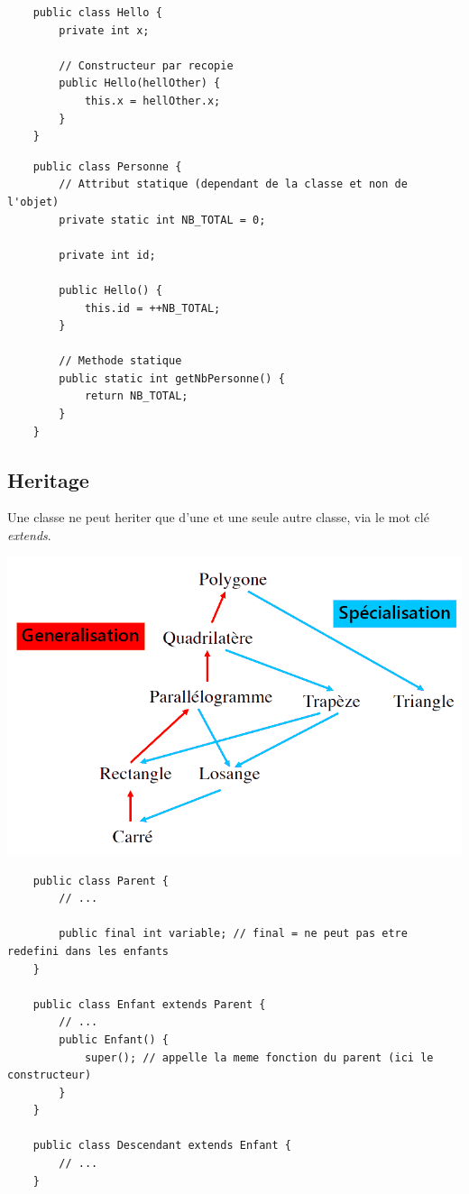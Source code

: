 \documentclass[a4paper, 12pt, french]{article}
\begin{document}
	\begin{lstlisting}
	public class Hello {
		private int x;

		// Constructeur par recopie
		public Hello(hellOther) {
			this.x = hellOther.x;
		}
	}
	\end{lstlisting}

	\begin{lstlisting}
	public class Personne {
		// Attribut statique (dependant de la classe et non de l'objet)
		private static int NB_TOTAL = 0;

		private int id;

		public Hello() {
			this.id = ++NB_TOTAL;
		}

		// Methode statique
		public static int getNbPersonne() {
			return NB_TOTAL;
		}
	}
	\end{lstlisting}

	\subsection{Heritage}

	Une classe ne peut heriter que d'une et une seule autre classe, via le mot clé \emph{extends}.

	\includegraphics[width=13.8cm]{java_00_heritage}

	\begin{lstlisting}
	public class Parent {
		// ...

		public final int variable; // final = ne peut pas etre redefini dans les enfants
	}

	public class Enfant extends Parent {
		// ...
		public Enfant() {
			super(); // appelle la meme fonction du parent (ici le constructeur)
		}
	}

	public class Descendant extends Enfant {
		// ...
	}
	\end{lstlisting}
\end{document}
